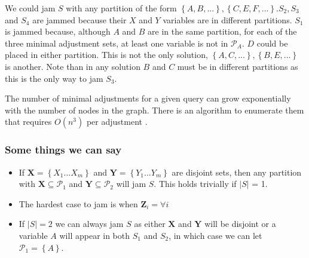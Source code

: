 \documentclass{article}
\newcommand{\set}[1]{\left\{#1\right\}}
\newcommand{\pt}{\mathcal P}
\theoremstyle{plain}
\theoremstyle{definition}
\begin{document}
We could jam $S$ with any partition of the form $\set{A,B,...},\set{C,E,F,...}$.$S_2,S_3$ and $S_4$ are jammed because their $X$ and $Y$ variables are in different partitions. $S_1$ is jammed because, although $A$ and $B$ are in the same partition, for each of the three minimal adjustment sets, at least one variable is not in $\pt_A$. $D$ could be placed in either partition. This is not the only solution, $\set{A,C,...},\set{B,E,...}$ is another. Note than in any solution $B$ and $C$ must be in different partitions as this is the only way to jam $S_3$.

The number of minimal adjustments for a given query can grow exponentially with the number of nodes in the graph. There is an algorithm to enumerate them that requires $O(n^3)$ per adjustment \cite{textor2012adjustment} .


\begin{figure}
\caption{}
\label{fig:minimal_sets_example}
\centering
\end{figure}



\subsubsection{Some things we can say}

\begin{itemize}
\item If $\boldsymbol{X} = \set{X_1 ... X_m}$ and $\boldsymbol{Y} = \set{Y_1...Y_m}$ are disjoint sets, then any partition with $\boldsymbol{X} \subseteq \pt_1$ and $\boldsymbol{Y} \subseteq \pt_2$ will jam $S$. This holds trivially if $|S|$ = 1.
\item The hardest case to jam is when $\boldsymbol{Z}_i = {} \forall i$
\item If $|S| = 2$ we can always jam $S$ as either $\boldsymbol{X}$ and $\boldsymbol{Y}$ will be disjoint or a variable $A$ will appear in both $S_1$ and $S_2$, in which case we can let $\pt_1 = \set{A}$.
\end{itemize}
\end{document}
